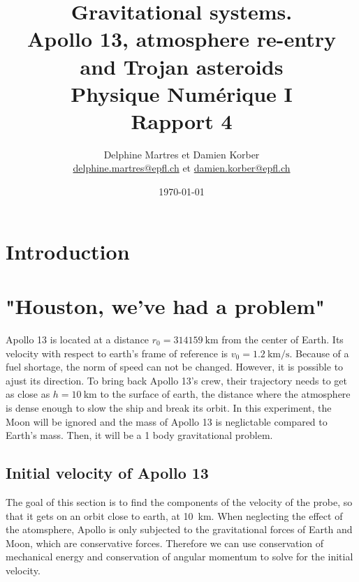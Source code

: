 \documentclass[a4paper,12pt,twoside]{article}
\newcommand{\mail}[1]{{\href{mailto:#1}{#1}}}
\begin{document}
\title{Gravitational systems.\\{\small Apollo 13, atmosphere re-entry and Trojan asteroids \\ Physique Numérique I}\\{\small Rapport 4}}
\date{\today}
\author{Delphine Martres et Damien Korber\\{\small \mail{delphine.martres@epfl.ch} et \mail{damien.korber@epfl.ch}}}
\maketitle
\tableofcontents %

\baselineskip=16pt
\parindent=15pt
\parskip=5pt
\newpage



\section{Introduction}

\section{"Houston, we've had a problem"}
Apollo 13 is located at a distance $r_0 = \SI{314159}{\kilo\meter}$ from the center of Earth.
Its velocity with respect to earth's frame of reference is $v_0 = \SI{1.2}{\kilo\meter\per\second}$.
Because of a fuel shortage, the norm of speed can not be changed.
However, it is possible to ajust its direction.
To bring back Apollo 13's crew, their trajectory needs to get as close as $h=\SI{10}{\kilo\meter}$ to the surface of earth, the distance where the atmosphere is dense enough to slow the ship and break its orbit.
In this experiment, the Moon will be ignored and the mass of Apollo 13 is neglictable compared to Earth's mass. Then, it will be a 1 body gravitational problem.


\subsection{Initial velocity of Apollo 13}
The goal of this section is to find the components of the velocity of the probe, so that it gets on an orbit close to earth, at \SI{10}{\kilo\meter}. When neglecting the effect of the atomsphere, Apollo is only subjected to the gravitational forces of Earth and Moon, which are conservative forces. Therefore we can use conservation of mechanical energy and conservation of angular momentum to solve for the initial velocity.
\end{document}
